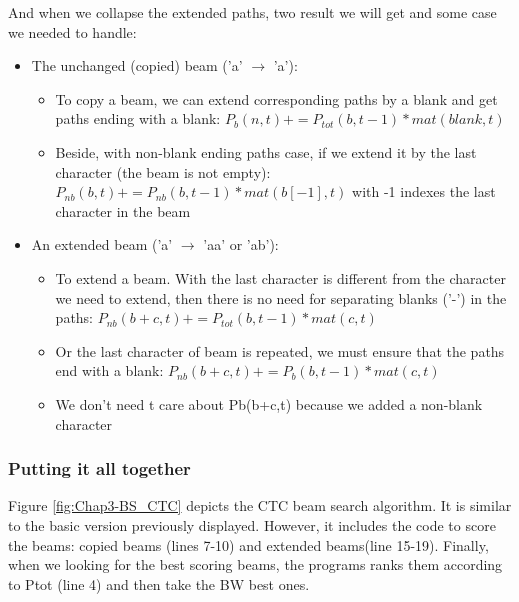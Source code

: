 And when we collapse the extended paths, two result we will get and some case we needed to handle:
\begin{itemize}
	\item The unchanged (copied) beam ('a' $ \rightarrow $ 'a'):
	      \begin{itemize}
	      	\item To copy a beam, we can extend corresponding paths by a blank and get
	      	      paths ending with a blank: $ P_b (n, t) += P_{tot}(b, t-1)*mat(blank, t) $
	      	\item Beside, with non-blank ending paths case, if we extend it by the last
	      	      character (the beam is not empty): $ P_{nb}(b,t) += P_{nb}(b,t-1)*mat(b[-1],t) $
	      	      with -1 indexes the last character in the beam
	      \end{itemize}
	\item An extended beam ('a' $\rightarrow$ 'aa' or 'ab'):
	      \begin{itemize}
	      	\item To extend a beam. With the last character is different from the character we need
	      	      to extend, then there is no need for separating blanks ('-') in the paths:
	      	      $ P_{nb}(b+c,t) += P_{tot}(b,t-1)*mat(c,t) $
	      	\item Or the last character of beam is repeated, we must ensure that the paths
	      	      end with a blank: $ P_{nb}(b+c,t) += P_b(b,t-1)*mat(c,t) $
	      	\item We don't need t care about Pb(b+c,t) because we added a non-blank character
	      \end{itemize}
\end{itemize}

\subsubsection{ Putting it all together }
Figure \ref{fig:Chap3-BS_CTC} depicts the CTC beam search algorithm. It is similar to the basic version
previously displayed. However, it includes the code to score the beams: copied beams
(lines 7-10) and extended beams(line 15-19). Finally, when we looking for the best scoring
beams, the programs ranks them according to Ptot (line 4) and then take the BW best ones.

